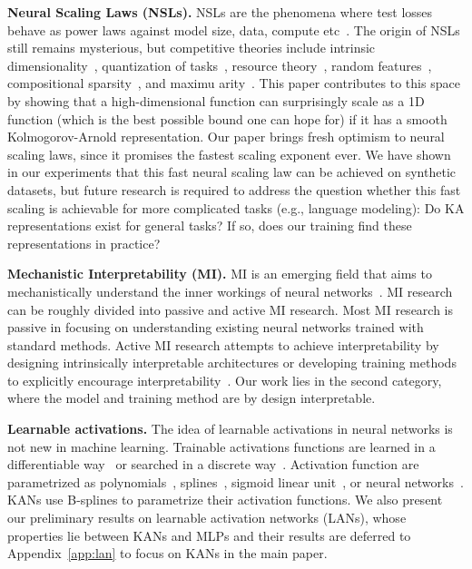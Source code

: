 \documentclass{article}
\numberwithin{equation}{section}
\numberwithin{figure}{section}
\begin{document}
{\bf Neural Scaling Laws (NSLs).} NSLs are the phenomena where test losses behave as power laws against model size, data, compute etc~\cite{kaplan2020scaling,henighan2020scaling,gordon2021data,hestness2017deep,sharma2020neural,bahri2021explaining,michaud2023the,song2024resource}. The origin of NSLs still remains mysterious, but competitive theories include intrinsic dimensionality~\cite{kaplan2020scaling}, quantization of tasks~\cite{michaud2023the}, resource theory~\cite{song2024resource}, random features~\cite{bahri2021explaining}, compositional sparsity~\cite{poggio2022deep}, and maximu arity~\cite{michaud2023precision}. This paper contributes to this space by showing that a high-dimensional function can surprisingly scale as a 1D function (which is the best possible bound one can hope for) if it has a smooth Kolmogorov-Arnold representation. Our paper brings fresh optimism to neural scaling laws, since it promises the fastest scaling exponent ever. We have shown in our experiments that this fast neural scaling law can be achieved on synthetic datasets, but future research is required to address the question  whether this fast scaling is achievable for more complicated tasks (e.g., language modeling): Do KA representations exist for general tasks? If so, does our training find these representations in practice?

{\bf Mechanistic Interpretability (MI).} MI is an emerging field that aims to mechanistically understand the inner workings of neural networks~\cite{olsson2022context,meng2022locating,wang2023interpretability,elhage2022toy,nanda2023progress,zhong2023the,liu2023seeing,elhage2022solu,cunningham2023sparse}. MI research can be roughly divided into passive and active MI research. Most MI research is passive in focusing on understanding existing neural networks trained with standard methods. Active MI research attempts to achieve interpretability by designing intrinsically interpretable architectures or developing training methods to explicitly encourage interpretability~\cite{liu2023seeing,elhage2022solu}. Our work lies in the second category, where the model and training method are by design interpretable.   

{\bf Learnable activations.} The idea of learnable activations in neural networks is not new in machine learning. Trainable activations functions are learned in a differentiable way~\cite{goyal2019learning, fakhoury2022exsplinet, ramachandran2017searching, zhang2022neural} or searched in a discrete way~\cite{bingham2022discovering}. Activation function are parametrized as polynomials~\cite{goyal2019learning}, splines~\cite{fakhoury2022exsplinet,bohra2020learning,aziznejad2019deep}, sigmoid linear unit~\cite{ramachandran2017searching}, or neural networks~\cite{zhang2022neural}. KANs use B-splines to parametrize their activation functions. We also present our preliminary results on learnable activation networks (LANs), whose properties lie between KANs and MLPs and their results are deferred to Appendix~\ref{app:lan} to focus on KANs in the main paper.
\end{document}
